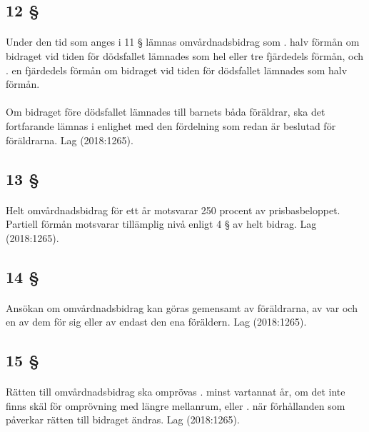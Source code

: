 \documentclass[a4paper,notitlepage,openany,10pt]{book}
\begin{document}
\subsection*{12 §}
\paragraph*{}
Under den tid som anges i 11 § lämnas omvårdnadsbidrag som
. halv förmån om bidraget vid tiden för dödsfallet lämnades som hel eller tre fjärdedels förmån, och
. en fjärdedels förmån om bidraget vid tiden för dödsfallet lämnades som halv förmån.
\paragraph*{}
Om bidraget före dödsfallet lämnades till barnets båda föräldrar, ska det fortfarande lämnas i enlighet med den fördelning som redan är beslutad för föräldrarna.
Lag (2018:1265).
\subsection*{13 §}
\paragraph*{}
Helt omvårdnadsbidrag för ett år motsvarar 250 procent av prisbasbeloppet. Partiell förmån motsvarar tillämplig nivå enligt 4 § av helt bidrag.
Lag (2018:1265).
\subsection*{14 §}
\paragraph*{}
Ansökan om omvårdnadsbidrag kan göras gemensamt av föräldrarna, av var och en av dem för sig eller av endast den ena föräldern.
Lag (2018:1265).
\subsection*{15 §}
\paragraph*{}
Rätten till omvårdnadsbidrag ska omprövas
. minst vartannat år, om det inte finns skäl för omprövning med längre mellanrum, eller
. när förhållanden som påverkar rätten till bidraget ändras.
Lag (2018:1265).
\end{document}
